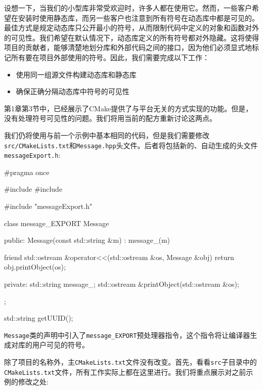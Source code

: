 设想一下，当我们的小型库非常受欢迎时，许多人都在使用它。然而，一些客户希望在安装时使用静态库，而另一些客户也注意到所有符号在动态库中都是可见的。最佳方式是规定动态库只公开最小的符号，从而限制代码中定义的对象和函数对外的可见性。我们希望在默认情况下，动态库定义的所有符号都对外隐藏。这将使得项目的贡献者，能够清楚地划分库和外部代码之间的接口，因为他们必须显式地标记所有要在项目外部使用的符号。因此，我们需要完成以下工作：

\begin{itemize}
\item 使用同一组源文件构建动态库和静态库

\item 确保正确分隔动态库中符号的可见性

\end{itemize}

第1章第3节中，已经展示了CMake提供了与平台无关的方式实现的功能。但是，没有处理符号可见性的问题。我们将用当前的配方重新讨论这两点。


我们仍将使用与前一个示例中基本相同的代码，但是我们需要修改\texttt{src/CMakeLists.txt}和\texttt{Message.hpp}头文件。后者将包括新的、自动生成的头文件\texttt{messageExport.h}:

\begin{codebox}[cpp]
#pragma once

#include
#include

#include "messageExport.h"

class message_EXPORT Message
{
public:
  Message(const std::string &m) : message_(m) {}

  friend std::ostream &operator<<(std::ostream &os, Message &obj)
  {
    return obj.printObject(os);
  }

private:
  std::string message_;
  std::ostream &printObject(std::ostream &os);
};

std::string getUUID();
\end{codebox}

\texttt{Message}类的声明中引入了\texttt{message\_EXPORT}预处理器指令，这个指令将让编译器生成对库的用户可见的符号。


除了项目的名称外，主\texttt{CMakeLists.txt}文件没有改变。首先，看看\texttt{src}子目录中的\texttt{CMakeLists.txt}文件，所有工作实际上都在这里进行。我们将重点展示对之前示例的修改之处:

